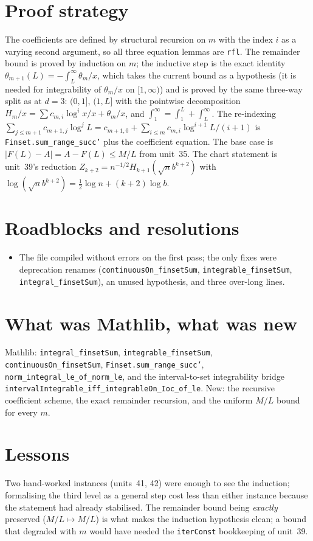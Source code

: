 \documentclass[11pt]{article}
\begin{document}
\section{Proof strategy}
The coefficients are defined by structural recursion on $m$ with the index $i$ as a varying second
argument, so all three equation lemmas are \texttt{rfl}. The remainder bound is proved by induction
on $m$; the inductive step is the exact identity $\theta_{m+1}(L)=-\int_L^\infty\theta_m/x$, which
takes the current bound as a hypothesis (it is needed for integrability of $\theta_m/x$ on
$[1,\infty)$) and is proved by the same three-way split as at $d=3$: $(0,1]$, $(1,L]$ with the
pointwise decomposition $H_m/x=\sum c_{m,i}\log^ix/x+\theta_m/x$, and $\int_1^\infty=\int_1^L+
\int_L^\infty$. The re-indexing $\sum_{j\le m+1}c_{m+1,j}\log^jL=c_{m+1,0}+\sum_{i\le m}
c_{m,i}\log^{i+1}L/(i+1)$ is \texttt{Finset.sum\_range\_succ'} plus the coefficient equation.
The base case is $|F(L)-A|=A-F(L)\le M/L$ from unit~35. The chart statement is unit~39's reduction
$Z_{k+2}=n^{-1/2}H_{k+1}(\sqrt nb^{k+2})$ with $\log(\sqrt nb^{k+2})=\tfrac12\log n+(k+2)\log b$.

\section{Roadblocks and resolutions}
\begin{itemize}
\item The file compiled without errors on the first pass; the only fixes were deprecation renames
(\texttt{continuousOn\_finsetSum}, \texttt{integrable\_finsetSum}, \texttt{integral\_finsetSum}), an
unused hypothesis, and three over-long lines.
\end{itemize}

\section{What was Mathlib, what was new}
Mathlib: \texttt{integral\_finsetSum}, \texttt{integrable\_finsetSum},
\texttt{continuousOn\_finsetSum}, \texttt{Finset.sum\_range\_succ'},
\texttt{norm\_integral\_le\_of\_norm\_le}, and the interval-to-set integrability bridge
\texttt{intervalIntegrable\_iff\_integrableOn\_Ioc\_of\_le}. New: the recursive coefficient scheme,
the exact remainder recursion, and the uniform $M/L$ bound for every $m$.

\section{Lessons}
Two hand-worked instances (units~41, 42) were enough to see the induction; formalising the third
level as a general step cost less than either instance because the statement had already stabilised.
The remainder bound being \emph{exactly} preserved ($M/L\mapsto M/L$) is what makes the induction
hypothesis clean; a bound that degraded with $m$ would have needed the \texttt{iterConst} bookkeeping
of unit~39.
\end{document}
